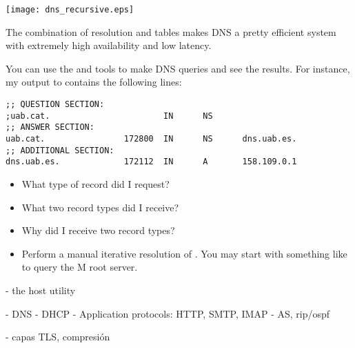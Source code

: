 \begin{center}
\texttt{[image: dns\_recursive.eps]}
\end{center}

The combination of  resolution and  tables makes
DNS a pretty efficient system with extremely high availability and low latency.

\begin{exercise}
You can use the  and  tools to make DNS queries
and see the results. For instance, my output to 
contains the following lines:

\vspace{0.25cm}
\begin{verbatim}
;; QUESTION SECTION:
;uab.cat.                       IN      NS
;; ANSWER SECTION:
uab.cat.                172800  IN      NS      dns.uab.es.
;; ADDITIONAL SECTION:
dns.uab.es.             172112  IN      A       158.109.0.1
\end{verbatim}
\vspace{0.25cm}

\begin{itemize}
\item What type of record did I request?
\item What two record types did I receive?
\item Why did I receive two record types?
\item Perform a manual iterative resolution of .
  You may start with something like 
  to query the M root server.
\end{itemize}


\end{exercise}


- the host utility


- DNS
- DHCP
- Application protocols: HTTP, SMTP, IMAP
- AS, rip/ospf

- capas TLS, compresión

